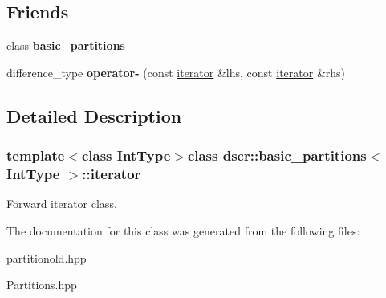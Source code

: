 \subsection*{Friends}
\begin{DoxyCompactItemize}
\item 
\hypertarget{classdscr_1_1basic__partitions_1_1iterator_a2b0b95278bcc9e922f634b05d4d5795b}{class {\bfseries basic\-\_\-partitions}}\label{classdscr_1_1basic__partitions_1_1iterator_a2b0b95278bcc9e922f634b05d4d5795b}

\item 
\hypertarget{classdscr_1_1basic__partitions_1_1iterator_a4304f5d7bb1d12de2d2ad2c1e4e64dab}{difference\-\_\-type {\bfseries operator-\/} (const \hyperlink{classdscr_1_1basic__partitions_1_1iterator}{iterator} \&lhs, const \hyperlink{classdscr_1_1basic__partitions_1_1iterator}{iterator} \&rhs)}\label{classdscr_1_1basic__partitions_1_1iterator_a4304f5d7bb1d12de2d2ad2c1e4e64dab}

\end{DoxyCompactItemize}


\subsection{Detailed Description}
\subsubsection*{template$<$class Int\-Type$>$class dscr\-::basic\-\_\-partitions$<$ Int\-Type $>$\-::iterator}

Forward iterator class. 

The documentation for this class was generated from the following files\-:\begin{DoxyCompactItemize}
\item 
partitionold.\-hpp\item 
Partitions.\-hpp\end{DoxyCompactItemize}
